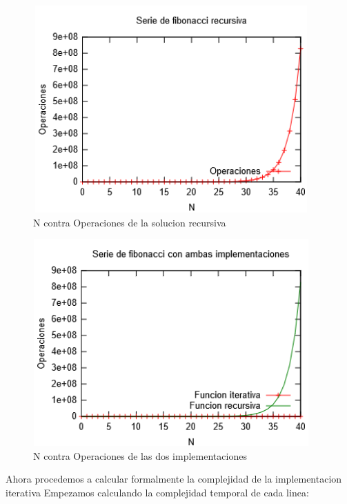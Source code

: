 \documentclass[spanish]{article}
\begin{document}
			\begin{figure}[H]
				\centering
				\includegraphics[width=400px,height=300px]{grafica2}
				\caption{N contra Operaciones de la solucion recursiva}
			\end{figure}
			\begin{figure}[H]
				\centering
				\includegraphics[width=400px,height=300px]{grafica3}
				\caption{N contra Operaciones de las dos implementaciones}
			\end{figure}
			Ahora procedemos a calcular formalmente la complejidad de la implementacion iterativa
			Empezamos calculando la complejidad temporal de cada linea:
\end{document}

